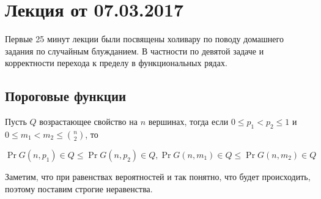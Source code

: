 \section{Лекция от 07.03.2017}

Первые 25 минут лекции были посвящены холивару по поводу домашнего задания по
случайным блужданием. В частности по девятой задаче и корректности
перехода к пределу в функциональных рядах.

\subsection{Пороговые функции}


\begin{lemma}
  Пусть $Q$ возрастающее свойство на $n$ вершинах, тогда если $0 \leq p_1
  < p_2 \leq 1$ и $0 \leq m_1 < m_2 \leq \binom{n}{2}$, то

  \[
    \Pr{G(n, p_1) \in Q} \leq \Pr{G(n, p_2) \in Q}, \Pr{G(n, m_1) \in Q} \leq
    \Pr{G(n, m_2) \in Q}
  \]
\end{lemma}

Заметим, что при равенствах вероятностей и так понятно, что будет происходить,
поэтому поставим строгие неравенства.

